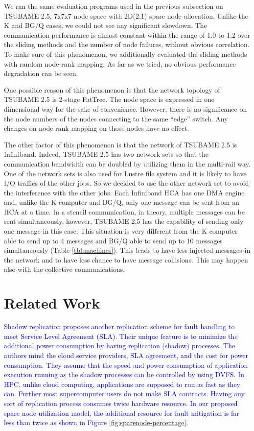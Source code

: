 \documentclass[Afour,times,sagev]{sagej}
\newcommand{\AH}[1]{%
  \textcolor{blue}{#1}}%
\begin{document}
We ran the same evaluation programs used in the previous subsection on
TSUBAME 2.5, 7x7x7 node space with 2D(2,1) spare node
allocation. Unlike the K and BG/Q cases, 
we could not see any significant slowdown. The communication
performance is almost constant within the range of 1.0 to 1.2 over the
sliding methods and the number of node failures, without obvious
correlation. To make sure of this phenomenon, we additionally
evaluated the sliding methods with random node-rank mapping. As far as
we tried, no obvious performance degradation can be seen.

One possible reason of this phenomenon is that the network topology of
TSUBAME 2.5 is 2-stage FatTree. The node space is expressed in one
dimensional way for the sake of convenience. However, there is no
significance on the node numbers of the nodes connecting to the same
``edge'' switch. Any changes on node-rank mapping on those nodes have
no effect. 

The other factor of this phenomenon is that the network of TSUBAME 2.5
is Infiniband. Indeed, TSUBAME 2.5 has two network sets so that the
communication bandwidth can be doubled by utilizing them in the
multi-rail way\cite{1392963}. One of the network sets is also used for
Lustre file system and it is likely to have I/O traffics of the other
jobs. So we decided to use the other network set to 
avoid the interference with the other jobs. Each Infiniband HCA has
one DMA engine and, unlike the K computer and BG/Q, only one message
can be sent from an HCA at a time. In a stencil communication, in
theory, multiple messages can be sent simultaneously, however, TSUBAME
2.5 has the capability of sending only one message in this case. This
situation is very different from the K computer able to send up to 4
messages and BG/Q able to send up to 10 messages simultaneously (Table
\ref{tbl:machines}). This leads to have less injected messages in the
network and to have less chance to have message collisions. This may
happen also with the collective communications.

\section{Related Work}\label{sec:related-work}

\AH{Shadow replication proposes another replication scheme
for fault handling to meet Service Level Agreement
(SLA)\cite{6785308}. Their unique feature is to minimize the
additional power consumption by having replication (shadow)
processes. The authors mind the cloud service providers, SLA
agreement, and the cost for power consumption. They assume that the
speed and power consumption of application execution running as the
shadow processes can be controlled by using DVFS. In HPC, unlike cloud
computing, applications are supposed to run as fast as they
can. Further most supercomputer users do not make
SLA contracts. Having any sort of replication process consumes twice
hardware resource.  In our proposed spare node utilization model, the
additional resource for fault mitigation is far less than twice as
shown in Figure \ref{fig:sparenode-percentage}. 
}
\end{document}
